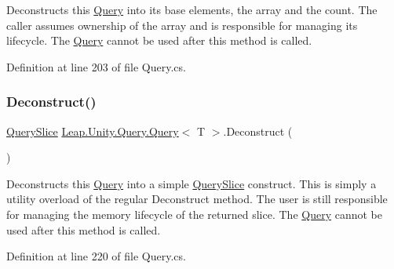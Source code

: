 Deconstructs this \mbox{\hyperlink{struct_leap_1_1_unity_1_1_query_1_1_query}{Query}} into its base elements, the array and the count. The caller assumes ownership of the array and is responsible for managing its lifecycle. The \mbox{\hyperlink{struct_leap_1_1_unity_1_1_query_1_1_query}{Query}} cannot be used after this method is called. 



Definition at line 203 of file Query.\+cs.

\mbox{\label{struct_leap_1_1_unity_1_1_query_1_1_query_a945832fdab8203804442a9d043ea55cf}} 
\subsubsection{\texorpdfstring{Deconstruct()}{Deconstruct()}\hspace{0.1cm}{\footnotesize\ttfamily [2/2]}}
{\footnotesize\ttfamily \mbox{\hyperlink{struct_leap_1_1_unity_1_1_query_1_1_query_1_1_query_slice}{Query\+Slice}} \mbox{\hyperlink{struct_leap_1_1_unity_1_1_query_1_1_query}{Leap.\+Unity.\+Query.\+Query}}$<$ T $>$.Deconstruct (\begin{DoxyParamCaption}{ }\end{DoxyParamCaption})}



Deconstructs this \mbox{\hyperlink{struct_leap_1_1_unity_1_1_query_1_1_query}{Query}} into a simple \mbox{\hyperlink{struct_leap_1_1_unity_1_1_query_1_1_query_1_1_query_slice}{Query\+Slice}} construct. This is simply a utility overload of the regular Deconstruct method. The user is still responsible for managing the memory lifecycle of the returned slice. The \mbox{\hyperlink{struct_leap_1_1_unity_1_1_query_1_1_query}{Query}} cannot be used after this method is called. 



Definition at line 220 of file Query.\+cs.

\mbox{\label{struct_leap_1_1_unity_1_1_query_1_1_query_a4c333e8a0bb14c3237fa65d2ad308c5a}} 
